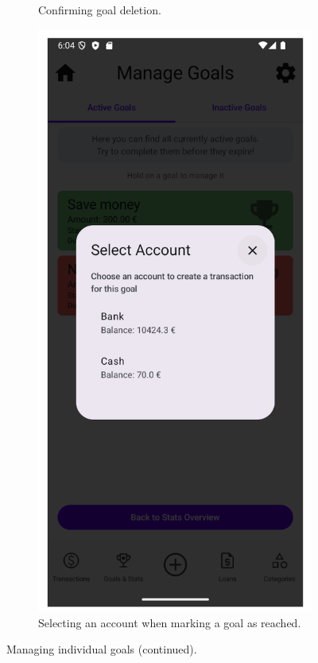 \documentclass[a4paper,12pt]{article}
\begin{document}
\begin{figure}[H]
\begin{subfigure}[b]{0.23\textwidth}
        \caption{Confirming goal deletion.}
        \label{fig:goal_delete_confirm}
    \end{subfigure}
    \hfill
    \begin{subfigure}[b]{0.23\textwidth}
        \includegraphics[width=\textwidth]{manage_goals_complete_dialog.png}
        \caption{Selecting an account when marking a goal as reached.}
        \label{fig:goal_mark_reached_account}
    \end{subfigure}
    \caption{Managing individual goals (continued).}
    \label{fig:goals_stats_tracking_2}
\end{figure}
\end{document}
